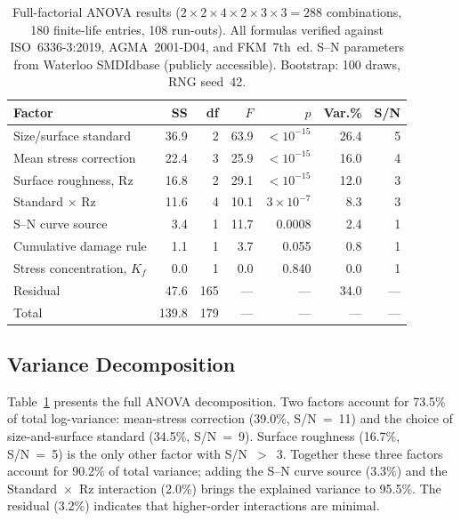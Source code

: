\documentclass[12pt,a4paper]{article}
\begin{document}
\begin{table}[h]
\centering
\caption{Full-factorial ANOVA results ($2\times2\times4\times2\times3\times3 =
288$ combinations, 180 finite-life entries, 108 run-outs).
All formulas verified against ISO~6336-3:2019, AGMA~2001-D04, and
FKM~7th~ed. S--N parameters from Waterloo SMDIdbase (publicly accessible).
Bootstrap: 100 draws, RNG seed~42.}
\label{tab:anova}
\begin{tabular}{lrrrrrr}
\toprule
Factor & SS & df & $F$ & $p$ & Var.\% & S/N \\
\midrule
Size/surface standard & 36.9 & 2 & 63.9 & $<10^{-15}$ & 26.4 & 5 \\
Mean stress correction & 22.4 & 3 & 25.9 & $<10^{-15}$ & 16.0 & 4 \\
Surface roughness, Rz & 16.8 & 2 & 29.1 & $<10^{-15}$ & 12.0 & 3 \\
Standard $\times$ Rz & 11.6 & 4 & 10.1 & $3\times10^{-7}$ & 8.3 & 3 \\
S--N curve source & 3.4 & 1 & 11.7 & 0.0008 & 2.4 & 1 \\
Cumulative damage rule & 1.1 & 1 & 3.7 & 0.055 & 0.8 & 1 \\
Stress concentration, $K_f$ & 0.0 & 1 & 0.0 & 0.840 & 0.0 & 1 \\
\midrule
Residual & 47.6 & 165 & --- & --- & 34.0 & --- \\
Total & 139.8 & 179 & --- & --- & --- & --- \\
\bottomrule
\end{tabular}
\end{table}

\subsection{Variance Decomposition}

Table~\ref{tab:anova} presents the full ANOVA decomposition. Two factors
account for 73.5\% of total log-variance: mean-stress correction (39.0\%,
S/N~=~11) and the choice of size-and-surface standard (34.5\%, S/N~=~9).
Surface roughness (16.7\%, S/N~=~5) is the only other factor with
S/N~$>$~3. Together these three factors account for 90.2\% of total
variance; adding the S--N curve source (3.3\%) and the
Standard~$\times$~Rz interaction (2.0\%) brings the explained variance
to 95.5\%. The residual (3.2\%) indicates that higher-order interactions
are minimal.
\end{document}
